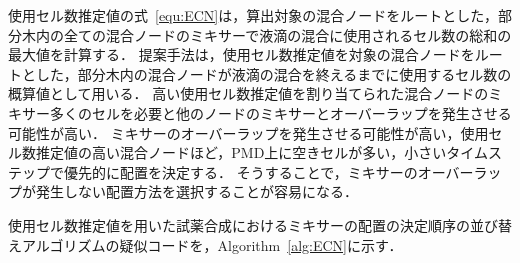 使用セル数推定値の式~\eqref{equ:ECN}は，算出対象の混合ノードをルートとした，部分木内の全ての混合ノードのミキサーで液滴の混合に使用されるセル数の総和の最大値を計算する．
提案手法は，使用セル数推定値を対象の混合ノードをルートとした，部分木内の混合ノードが液滴の混合を終えるまでに使用するセル数の概算値として用いる．
高い使用セル数推定値を割り当てられた混合ノードのミキサー多くのセルを必要と他のノードのミキサーとオーバーラップを発生させる可能性が高い．
ミキサーのオーバーラップを発生させる可能性が高い，使用セル数推定値の高い混合ノードほど，PMD上に空きセルが多い，小さいタイムステップで優先的に配置を決定する．
そうすることで，ミキサーのオーバーラップが発生しない配置方法を選択することが容易になる．

使用セル数推定値を用いた試薬合成におけるミキサーの配置の決定順序の並び替えアルゴリズムの疑似コードを，Algorithm~\ref{alg:ECN}に示す．
